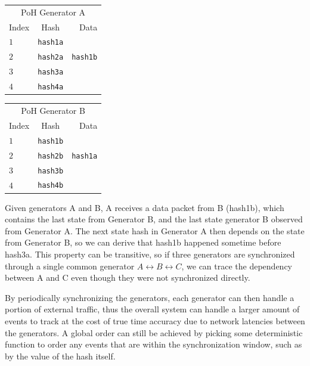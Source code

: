 \documentclass[12pt]{article}
\begin{document}
\begin{center}
  \begin{tabular}{|l c r|}

  \hline
    \multicolumn{3}{|c|}{PoH Generator A} \\
    Index & Hash & Data \\ \hline
    $1$ & \texttt{hash1a} & \\
    $2$ & \texttt{hash2a} & \texttt{hash1b} \\
    $3$ & \texttt{hash3a} & \\
    $4$ & \texttt{hash4a} & \\
    \hline
    \end{tabular}
  \begin{tabular}{| l  c  r |}
  \hline
    \multicolumn{3}{|c|}{PoH Generator B} \\
    Index & Hash & Data \\ \hline
    $1$ & \texttt{hash1b} & \\
    $2$ & \texttt{hash2b} & \texttt{hash1a} \\
    $3$ & \texttt{hash3b} & \\
    $4$ & \texttt{hash4b} & \\
    \hline
    \end{tabular}
\end{center}

Given generators A and B, A receives a data packet from B (hash1b), which contains the last state from Generator B, and the last state generator B observed from Generator A. The next state hash in Generator A then depends on the state from Generator B, so we can derive that hash1b happened sometime before hash3a. This property can be transitive, so if three generators are synchronized through a single common generator \(A \leftrightarrow B \leftrightarrow C\), we can trace the dependency between A and C even though they were not synchronized directly.

By periodically synchronizing the generators, each generator can then handle a portion of external traffic, thus the overall system can handle a larger amount of events to track at the cost of true time accuracy due to network latencies between the generators. A global order can still be achieved by picking some deterministic function to order any events that are within the synchronization window, such as by the value of the hash itself.
\end{document}
